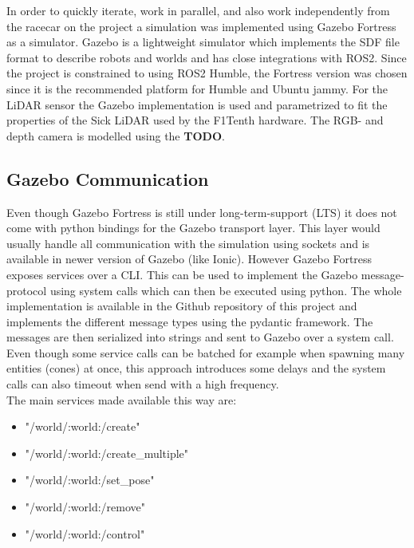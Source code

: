 In order to quickly iterate, work in parallel, and also work independently from the racecar on the project a simulation was implemented using Gazebo Fortress as a simulator.
Gazebo is a lightweight simulator which implements the SDF file format to describe robots and worlds and has close integrations with ROS2.
Since the project is constrained to using ROS2 Humble, the Fortress version was chosen since it is the recommended platform for Humble and Ubuntu jammy.
For the LiDAR sensor the Gazebo implementation is used and parametrized to fit the properties of the Sick LiDAR used by the F1Tenth hardware.
The RGB- and depth camera is modelled using the \textbf{TODO}.

\subsection{Gazebo Communication}

Even though Gazebo Fortress is still under long-term-support (LTS) it does not come with python bindings for the Gazebo transport layer. 
This layer would usually handle all communication with the simulation using sockets and is available in newer version of Gazebo (like Ionic). 
However Gazebo Fortress exposes services over a CLI. This can be used to implement the Gazebo message-protocol using system calls which can then be executed using python. 
The whole implementation is available in the Github repository of this project and implements the different message types using the pydantic framework. 
The messages are then serialized into strings and sent to Gazebo over a system call. 
Even though some service calls can be batched for example when spawning many entities (cones) at once, 
this approach introduces some delays and the system calls can also timeout when send with a high frequency.\\
\newline
The main services made available this way are:

\begin{itemize}
\item "/world/:world:/create"
\item "/world/:world:/create\_multiple"
\item "/world/:world:/set\_pose"
\item "/world/:world:/remove"
\item "/world/:world:/control"
\end{itemize}


